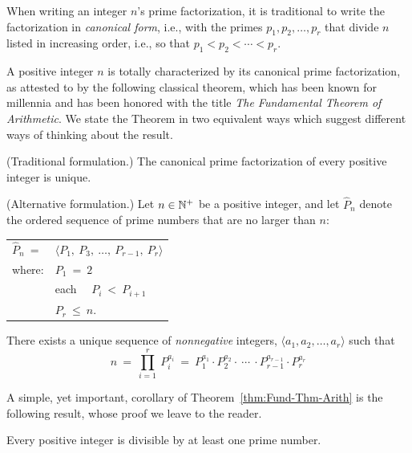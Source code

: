 When writing an integer $n$'s prime factorization, it is traditional
to write the factorization in {\it canonical form},
i.e., with the primes $p_1, p_2, \ldots, p_r$ that divide $n$ listed
in increasing order, i.e., so that $p_1 < p_2 < \cdots < p_r$.

\noindent
A positive integer $n$ is totally characterized by its canonical prime
factorization, as attested to by the following classical theorem,
which has been known for millennia and has been honored with the title
{\em The Fundamental Theorem of Arithmetic}.
We state the Theorem in two equivalent ways which suggest different
ways of thinking about the result.

\begin{theorem}
\label{thm:Fund-Thm-Arith}

\noindent
{\rm (Traditional formulation.)}
%
The canonical prime factorization of every positive integer is unique.

\noindent
{\rm (Alternative formulation.)}
%
Let $n \in \mathbb{N}^+$ be a positive integer, and let $\widehat{P}_n$ denote the
ordered sequence of prime numbers that are no larger than $n$:

\begin{tabular}{ll}
$\widehat{P}_n \ =$  & $\langle P_1, \ P_3, \ \ldots, \ P_{r-1}, \ P_r \rangle$ \\
where:               & $P_1 \ = \ 2$ \\
                     & each  \ \ $P_i \ < \ P_{i+1}$ \\
                     & $P_r \ \leq \ n$.
\end{tabular}

\noindent
There exists a unique sequence of {\em nonnegative} integers, 
$\langle a_1, a_2, \ldots, a_r \rangle$
such that
\[
n \ = \ \prod_{i=1}^r \ P_i^{a_i} \ = \
P_1^{a_1} \cdot P_2^{a_2} \cdot \ \cdots \ \cdot P_{r-1}^{a_{r-1}} \cdot P_r^{a_r}
\]
\end{theorem}

A simple, yet important, corollary of Theorem~\ref{thm:Fund-Thm-Arith}
is the following result, whose proof we leave to the reader.

\begin{prop}
\label{thm:prime-divisor}
Every positive integer is divisible by at least one prime number.
\end{prop}


